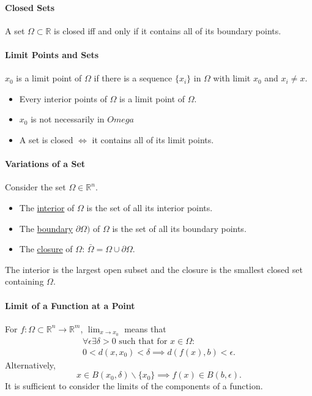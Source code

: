 \paragraph{Closed Sets}
A set \(\Omega \subset \mathbb{R}\) is closed iff and only if it contains all of its boundary points.

\paragraph{Limit Points and Sets}
\(x_0\) is a limit point of \(\Omega\) if there is a sequence \(\{x_i\}\) 
in \(\Omega\) with limit \(x_0\) and \(x_i \neq x\).

\begin{itemize}
    \item Every interior points of \(\Omega\) is a limit point of \(\Omega\).
    \item \(x_0\) is not necessarily in \(Omega\)
    \item A set is closed \(\Leftrightarrow\) it contains all of its limit points.
\end{itemize}

\paragraph{Variations of a Set}
Consider the set \(\Omega \in \mathbb{R}^n\).
\begin{itemize}
    \item The \underline{interior} of \(\Omega\) is the set of all its interior points.
    \item The \underline{boundary} \(\partial \Omega)\) of \(\Omega\) is the set of all its boundary points.
    \item The \underline{closure} of \(\Omega\): \(\bar{\Omega} = \Omega \cup \partial \Omega\).
\end{itemize}
The interior is the largest open subset and the closure is the smallest closed set containing \(\Omega\).

\paragraph{Limit of a Function at a Point}
For \(f: \Omega \subset \mathbb{R}^n \to \mathbb{R}^m\), 
\(\lim_{x\to x_0}\) means that 
\begin{align*}
    \forall \epsilon \exists \delta > 0\text{ such that for } x\in\Omega: \\
    0 < d(x, x_0) < \delta \implies d(f(x), b) < \epsilon.
\end{align*}
Alternatively,
\[
    x\in B(x_0, \delta) \backslash \{x_0\}
    \implies f(x)\in B(b, \epsilon).
\]
It is sufficient to consider the limits of the components of a function.

